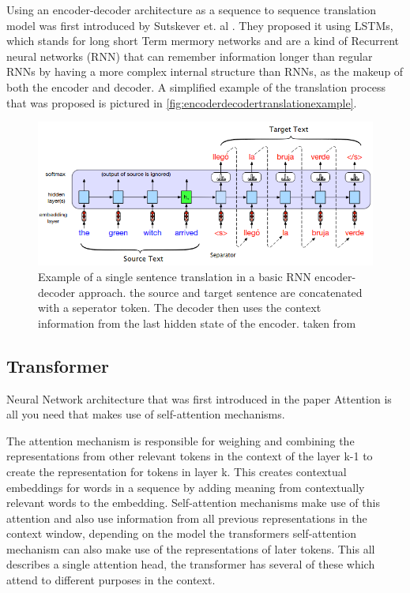 Using an encoder-decoder architecture as a sequence to sequence translation model was first introduced by Sutskever et. al \cite{sutskever2014sequencesequencelearningneural}.
They proposed it using LSTMs, which stands for long short Term mermory networks and are a kind of Recurrent neural networks (RNN) that can remember information longer than regular RNNs by having a more complex internal structure than RNNs, as the makeup of both the encoder and decoder. 
A simplified example of the translation process that was proposed is pictured in \autoref{fig:encoderdecodertranslationexample}.
\begin{figure}
    \centering
    \includegraphics[width=0.5\linewidth]{Latex//sections//images/encoderdecodertranslation.png}
    \caption{Example of a single sentence translation in a basic RNN encoder-decoder approach. the source and target sentence are concatenated with a seperator token. The decoder then uses the context information from the last hidden state of the encoder. taken from \cite{jm3}} 
    \label{fig:encoderdecodertranslationexample}
\end{figure}


\subsection{Transformer}
Neural Network architecture that was first introduced in the paper Attention is all you need \cite{vaswani2023attentionneed} that makes use of self-attention mechanisms. 

The attention mechanism is responsible for weighing and combining the representations from other relevant tokens in the context of the layer k-1 to create the representation for tokens in layer k. This creates contextual embeddings for words in a sequence by adding meaning from contextually relevant words to the embedding. 
Self-attention mechanisms make use of this attention and also use information from all previous representations in the context window, depending on the model the transformers self-attention mechanism can also make use of the representations of later tokens. This all describes a single attention head, the transformer has several of these which attend to different purposes in the context.

